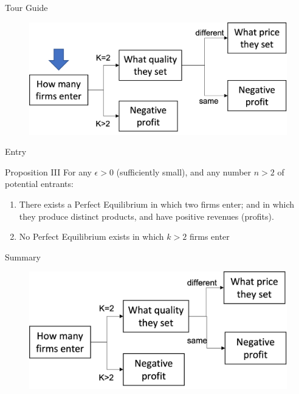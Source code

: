 \documentclass[10pt]{beamer}
\begin{document}
\begin{frame}{Tour Guide}
\begin{figure}
    \centering
    \includegraphics[width = .9\textwidth]{guide3.png}

\end{figure}
\end{frame}

\begin{frame}{Entry}
\begin{block}{Proposition III}
For any $\epsilon >0 $ (sufficiently small), and any number $n > 2$ of potential entrants:\\
\begin{enumerate}
    \item There exists a Perfect Equilibrium in which two firms enter; and in which they produce distinct products, and have positive revenues (profits).
    \item No Perfect Equilibrium exists in which $k > 2$ firms enter
\end{enumerate}
\end{block}
\end{frame}

\begin{frame}{Summary}
\begin{figure}
    \centering
    \includegraphics[width = .8\textwidth]{shaked1.png}
    \label{fig:sk1}
\end{figure}
    
\end{frame}
\end{document}
